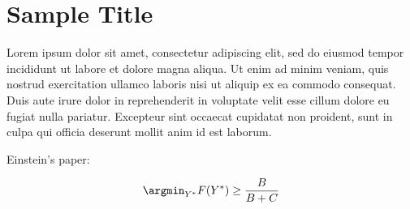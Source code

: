 \chapter{Sample Title}

Lorem ipsum dolor sit amet, consectetur adipiscing elit, sed do eiusmod tempor incididunt ut labore et dolore magna aliqua. Ut enim ad minim veniam, quis nostrud exercitation ullamco laboris nisi ut aliquip ex ea commodo consequat. Duis aute irure dolor in reprehenderit in voluptate velit esse cillum dolore eu fugiat nulla pariatur. Excepteur sint occaecat cupidatat non proident, sunt in culpa qui officia deserunt mollit anim id est laborum.

Einstein's paper: \cite{hcup}

\begin{equation}
  \argmin_{Y^{*}} F(Y^{*}) \geq \frac{B}{B + C} \\
\end{equation}
